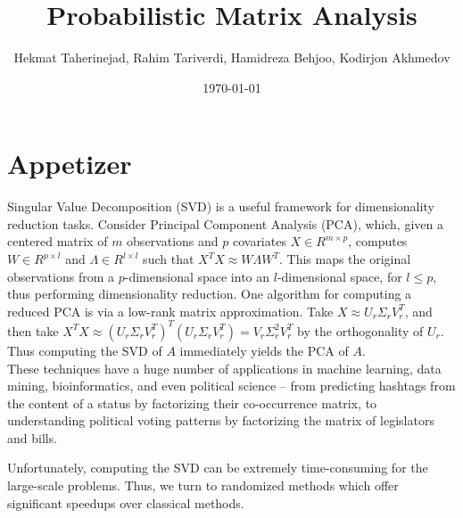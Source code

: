 \documentclass[a4paper,10pt]{article}
\begin{document}
%
   \title{Probabilistic Matrix Analysis}

   \author{ Hekmat Taherinejad, Rahim Tariverdi, Hamidreza Behjoo, Kodirjon Akhmedov}
          
   \date{\today}

   \maketitle
   
   \tableofcontents
 
  \newpage
    
\section{Appetizer}
Singular Value Decomposition (SVD) is a useful framework for dimensionality reduction tasks. Consider Principal Component Analysis (PCA), which, given a centered matrix of $m$ observations and $p$ covariates $X \in R^{m \times p}$, computes $W \in R^{p \times l}$ and $\Lambda \in R^{l \times l}$ such that $X^T X \approx W \Lambda W^T$. This maps the original observations from a $p$-dimensional space into an $l$-dimensional space, for $l \leq p$, thus performing dimensionality reduction. One algorithm for computing a reduced PCA is via a low-rank matrix approximation. Take $X \approx U_r \Sigma_r V_r ^T$, and then take $X^T X \approx (U_r \Sigma_r V_r^T)^{T} (U_r \Sigma_r V_r^T) = V_r \Sigma_r ^2 V_r^T$ by the orthogonality of $U_r$. Thus computing the SVD of $A$ immediately yields the PCA of $A$.\\

These techniques have a huge number of applications in machine learning, data mining, bioinformatics, and even political science -- from predicting hashtags from the content of a status by factorizing their co-occurrence matrix, to understanding political voting patterns by factorizing the matrix of legislators and bills.

Unfortunately, computing the SVD can be extremely time-consuming for the large-scale problems. Thus, we turn to randomized methods which offer significant speedups over classical methods.
\end{document}
